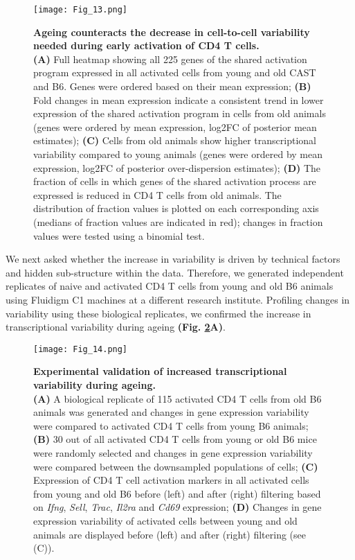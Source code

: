 \begin{figure}[!ht]
\centering
\texttt{[image: Fig\_13.png]}
\caption[Ageing destabilizes the CD4\plus{} T cell response]{\textbf{Ageing counteracts the decrease in cell-to-cell variability needed during early activation of CD4\plus{} T cells.} \\
\textbf{(A)} Full heatmap showing all 225 genes of the shared activation program expressed in all activated cells from young and old CAST and B6. Genes were ordered based on their mean expression; \textbf{(B)} Fold changes in mean expression indicate a consistent trend in lower expression of the shared activation program in cells from old animals (genes were ordered by mean expression, log2FC of posterior mean estimates); \textbf{(C)} Cells from old animals show higher transcriptional variability compared to young animals (genes were ordered by mean expression, log2FC of posterior over-dispersion estimates); \textbf{(D)} The fraction of cells in which genes of the shared activation process are expressed is reduced in CD4\plus{} T cells from old animals. The distribution of fraction values is plotted on each corresponding axis (medians of fraction values are indicated in red); changes in fraction values were tested using a binomial test.}
\label{fig1:variability_ageing}
\end{figure}

We next asked whether the increase in variability is driven by technical factors and hidden sub-structure within the data. Therefore, we generated independent replicates of naive and activated CD4\plus{} T cells from young and old B6 animals using Fluidigm C1 machines at a different research institute. Profiling changes in variability using these biological replicates, we confirmed the increase in transcriptional variability during ageing \textbf{(Fig. \ref{fig1:validation}A)}.

\begin{figure}[!ht]
\centering
\texttt{[image: Fig\_14.png]}
\caption[Experimental validation of increased transcriptional variability during ageing]{\textbf{Experimental validation of increased transcriptional variability during ageing.} \\
\textbf{(A)} A biological replicate of 115 activated CD4\plus{} T cells from old B6 animals was generated and changes in gene expression variability were compared to activated CD4\plus{} T cells from young B6 animals; \textbf{(B)} 30 out of all activated CD4\plus{} T cells from young or old B6 mice were randomly selected and changes in gene expression variability were compared between the downsampled populations of cells; \textbf{(C)} Expression of CD4\plus{} T cell activation markers in all activated cells from young and old B6 before (left) and after (right) filtering based on \textit{Ifng}, \textit{Sell}, \textit{Trac}, \textit{Il2ra} and \textit{Cd69} expression; \textbf{(D)} Changes in gene expression variability of activated cells between young and old animals are displayed before (left) and after (right) filtering (see (C)).}
\label{fig1:validation}
\end{figure}

